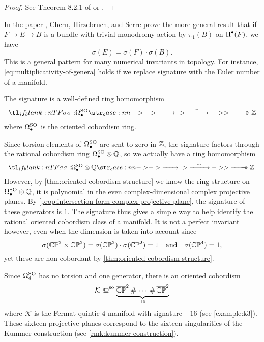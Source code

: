 \begin{remark}
\begin{proof}
	See Theorem 8.2.1 of \cite{hirzebruch1966methods} or \cite{chernhirzserre1957index}.
\end{proof}

\begin{remark}
	In the paper \cite{chernhirzserre1957index}, Chern, Hirzebruch, and Serre prove the more general result that if $F \to E \to B$ is a bundle with trivial monodromy action by $\pi_1(B)$ on $\operatorname{H}^\bullet(F)$, we have
	\begin{equation}\label{eq:multiplicativity-of-genera}
		\sigma(E) = \sigma(F)\cdot \sigma(B).
	\end{equation}
	This is a general pattern for many numerical invariants in topology. For instance, \cref{eq:multiplicativity-of-genera} holds if we replace signature with the Euler number of a manifold.
\end{remark}

\begin{corollary}
	The signature is a well-defined ring homomorphism
	\[
		\lkxfunc{\sigma}{\Omega^\SO_\bullet}{\Z}
	\]
	where $\Omega^{\mathrm{SO}}_\bullet$ is the oriented cobordism ring.
\end{corollary}

Since torsion elements of $\Omega^{\mathrm{SO}}_\bullet$ are sent to zero in $\mathbb{Z}$, the signature factors through the rational cobordism ring $\Omega^{\mathrm{SO}}_\bullet\otimes \mathbb{Q}$, so we actually have a ring homomorphism
\[
	\lkxfunc{\sigma}{\Omega^\SO_\bullet\otimes \Q}{\Z.}
\]
However, by \cref{thm:oriented-cobordism-structure} we know the ring structure on $\Omega^{\mathrm{SO}}_\bullet\otimes \mathbb{Q}$, it is polynomial in the even complex-dimensional complex projective planes. By \cref{prop:intersection-form-complex-projective-plane}, the signature of these generators is $1$. The signature thus gives a simple way to help identify the rational oriented cobordism class of a manifold. It is not a perfect invariant however, even when the dimension is taken into account since
\[
		\sigma(\mathbb{CP}^2\times\mathbb{CP}^2) = \sigma(\mathbb{CP}^2)\cdot \sigma(\mathbb{CP}^2)= 1\quad\textrm{and}\quad \sigma(\mathbb{CP}^4)=1,
\]
yet these are non cobordant by \cref{thm:oriented-cobordism-structure}.

\begin{example}
	Since $\Omega^{\mathrm{SO}}_4$ has no torsion and one generator, there is an oriented cobordism
	\[
		\mathcal{K} \sobord \underbrace{\overline{\CP}^2\+\cdots\+\overline{\CP}^2}_{16}
	\]
	where $\mathcal{K}$ is the Fermat quintic $4$-manifold with signature $-16$ (see \cref{example:k3}). These sixteen projective planes correspond to the sixteen singularities of the Kummer construction (see \cref{rmk:kummer-construction}).
\end{example}


\end{remark}
